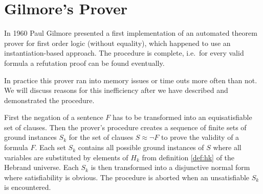 
\section{Gilmore's Prover}\label{sec:gilmore:prover}

In 1960 Paul Gilmore presented a first {\myem implementation} of an automated 
theorem prover \cite{5392528} for first order logic (without equality),
which happened to use an instantiation-based approach. 
The procedure is complete, i.e.~for every valid formula 
a refutation proof can be found eventually.

In practice this prover ran into memory issues or time outs more often than not.
We will discuss reasons for this inefficiency after we have described and demonstrated the procedure.

First the negation of a sentence $F$ has to be transformed into an equisatisfiable set of clauses.
Then the prover's procedure 
creates a sequence of finite sets of ground instances $S_k$ 
for the set of clauses $S\approx\lnot F$ to prove the validity of a formula $F$.
Each set $S_k$ contains all possible ground instances of $S$ 
where all variables are substituted by elements of $H_k$
from definition \ref{def:hk} of the Hebrand universe.
Each $S_k$ is then transformed into a disjunctive normal form where satisfiability is obvious.
The procedure is aborted when an unsatisfiable $S_k$ is encountered.

